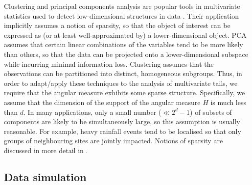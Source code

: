 \documentclass[en-GB, a4paper, nobind]{templates/bathreport}
\begin{document}
Clustering and principal components analysis are popular tools in multivariate statistics used to detect low-dimensional structures in data \autocite{jamesIntroductionStatisticalLearning2021}. Their application implicitly assumes a notion of sparsity, so that the object of interest can be expressed as (or at least well-approximated by) a lower-dimensional object. PCA assumes that certain linear combinations of the variables tend to be more likely than others, so that the data can be projected onto a lower-dimensional subspace while incurring minimal information loss. Clustering assumes that the observations can be partitioned into distinct, homogeneous subgroups. Thus, in order to adapt/apply these techniques to the analysis of multivariate tails, we require that the angular measure exhibits some sparse structure. Specifically, we assume that the dimension of the support of the angular measure \(H\) is much less than \(d\). In many applications, only a small number (\(\ll 2^d-1\)) of subsets of components are likely to be simultaneously large, so this assumption is usually reasonable. For example, heavy rainfall events tend to be localised so that only groups of neighbouring sites are jointly impacted. Notions of sparsity are discussed in more detail in \textcite{engelkeSparseStructuresMultivariate2021}.

\hypertarget{data-simulation}{%
\subsection{Data simulation}\label{data-simulation}}
\end{document}
